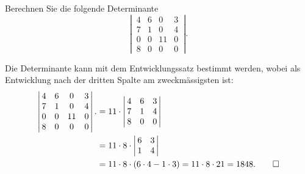 Berechnen Sie die folgende Determinante
\[
\left|\,\begin{matrix}
4&6& 0&3\\
7&1& 0&4\\
0&0&11&0\\
8&0& 0&0
\end{matrix}\,\right|.
\]




\begin{loesung}
Die Determinante kann mit dem Entwicklungssatz bestimmt werden, wobei
als Entwicklung nach der dritten Spalte am zweckmässigsten ist:
\begin{align*}
\left|\,\begin{matrix}
4&6& 0&3\\
7&1& 0&4\\
0&0&11&0\\
8&0& 0&0
\end{matrix}\,\right|.
&=
11\cdot
\left|\,\begin{matrix}
4&6&3\\
7&1&4\\
8&0&0
\end{matrix}\,\right|
\\
&=
11\cdot
8\cdot
\left|\,\begin{matrix}
6&3\\
1&4
\end{matrix}\,\right|
\\
&=
11\cdot
8\cdot
(6\cdot 4-1\cdot 3)=11\cdot 8\cdot 21=1848.
\qedhere
\end{align*}
\end{loesung}

